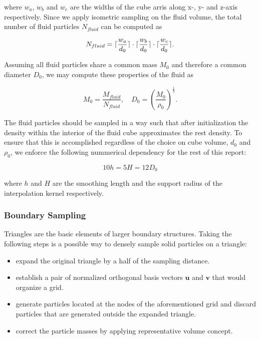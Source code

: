 \documentclass[
	11pt, 
	DIV10,
	ngerman,
	a4paper, 
	oneside, 
	headings=normal, 
	captions=tableheading,
	final, 
	numbers=noenddot
]{scrartcl}
\DeclarePairedDelimiter{\ceil}{\lceil}{\rceil}
\begin{document}
where $ w_{a} $, $ w_{b} $ and $ w_{c} $ are the widths of the cube arris along x-, y- and z-axis respectively. Since we apply isometric sampling on the fluid volume, the total number of fluid particles $ N_{fluid} $ can be computed as

\begin{equation}
	\label{eq2}
	N_{fluid} = \ceil{\frac{w_{a}}{d_{0}}} \cdot \ceil{\frac{w_{b}}{d_{0}}} \cdot \ceil{\frac{w_{c}}{d_{0}}}.
\end{equation}

Assuming all fluid particles share a common mass $ M_{0} $ and therefore a common diameter $ D_{0} $, we may compute these properties of the fluid as

\begin{equation}
	\label{eq3}
	M_{0} = \frac{M_{fluid}}{N_{fluid}}, \quad D_{0} = \left(\frac{M_{0}}{\rho_{0}}\right)^{\frac{1}{3}}.
\end{equation}

The fluid particles should be sampled in a way such that after initialization the density within the interior of the fluid cube approximates the rest density. To ensure that this is accomplished regardless of the choice on cube volume, $ d_{0} $ and $ \rho_{0} $, we enforce the following nummerical dependency for the rest of this report:

\begin{equation}
	\label{eq4}
	10h = 5H = 12D_{0}
\end{equation}

where $ h $ and $ H $ are the smoothing length and the support radius of the interpolation kernel respectively.

\subsubsection{Boundary Sampling}

Triangles are the basic elements of larger boundary structures. Taking the following steps is a possible way to densely sample solid particles on a triangle:

\begin{itemize}
    \item expand the original triangle by a half of the sampling distance.
    \item establish a pair of normalized orthogonal basis vectors $ \boldsymbol{u} $ and $ \boldsymbol{v} $ that would organize a grid.
    \item generate particles located at the nodes of the aforementioned grid and discard particles that are generated outside the expanded triangle.
    \item correct the particle masses by applying representative volume concept.
\end{itemize}
\end{document}
